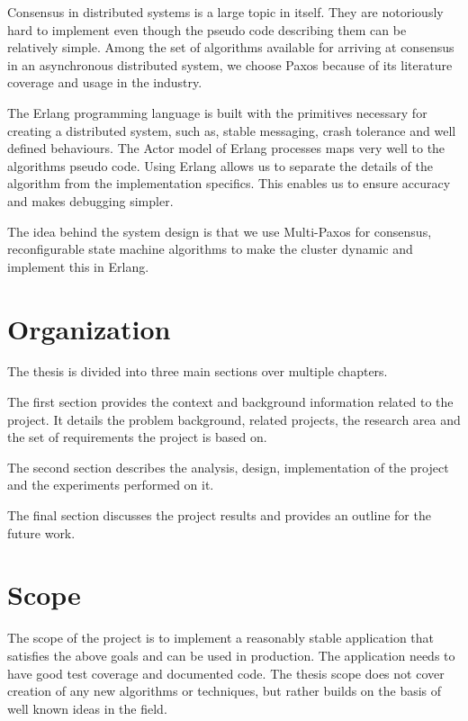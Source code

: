 Consensus in distributed systems is a large topic in itself. They are
notoriously hard to implement even though the pseudo code describing them can be
relatively simple. Among the set of algorithms available for arriving at
consensus in an asynchronous distributed system, we choose Paxos because of its
literature coverage and usage in the industry.

The Erlang programming language is built with the primitives necessary for
creating a distributed system, such as, stable messaging, crash tolerance and
well defined behaviours. The Actor model of Erlang processes maps very well to
the algorithms pseudo code. Using Erlang allows us to separate the details of
the algorithm from the implementation specifics. This enables us to ensure
accuracy and makes debugging simpler.

The idea behind the system design is that we use Multi-Paxos for consensus,
reconfigurable state machine algorithms to make the cluster dynamic and
implement this in Erlang.

\section{Organization}
The thesis is divided into three main sections over multiple chapters.

The first section provides the context and background information related to the
project. It details the problem background, related projects, the research
area and the set of requirements the project is based on.

The second section describes the analysis, design, implementation of the project
and the experiments performed on it.

The final section discusses the project results and provides an outline for
the future work.

\section{Scope}

The scope of the project is to implement a reasonably stable application that
satisfies the above goals and can be used in production. The application needs
to have good test coverage and documented code. The thesis scope does not cover
creation of any new algorithms or techniques, but rather builds on the basis of
well known ideas in the field.

